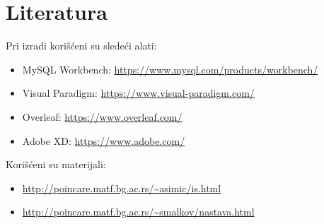 \section{Literatura}
Pri izradi korišćeni su sledeći alati:
\begin{itemize}
    \item MySQL Workbench: \url{https://www.mysql.com/products/workbench/}
    \item Visual Paradigm: \url{https://www.visual-paradigm.com/}
    \item Overleaf: \url{https://www.overleaf.com/}
    \item Adobe XD: \url{https://www.adobe.com/}
\end{itemize}
Korišćeni su materijali:
\begin{itemize}
    \item \url{http://poincare.matf.bg.ac.rs/~asimic/is.html}
    \item \url{http://poincare.matf.bg.ac.rs/~smalkov/nastava.html}
\end{itemize}
